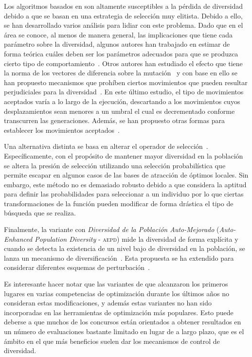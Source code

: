 Los algoritmos basados en \DE{} son altamente susceptibles a la pérdida de diversidad debido a que se basan en una estrategia de selección muy elitista.
%
Debido a ello, se han desarrollado varios análisis para lidiar con este problema.
%
Dado que en el área se conoce, al menos de manera general, las implicaciones que tiene cada parámetro sobre la diversidad, algunos autores han trabajado
en estimar de forma teórica cuáles deben ser los parámetros adecuados para que se produzca cierto tipo de comportamiento~\cite{zaharie2003control}.
%
Otros autores han estudiado el efecto que tiene la norma de los vectores de diferencia sobre la mutación~\cite{montgomery2009differential} y con base
en ello se han propuesto mecanismos que prohíben ciertos movimientos que pueden resultar perjudiciales para la diversidad~\cite{montgomery2012simple}.
%
En este último estudio, el tipo de movimientos aceptados varía a lo largo de la ejecución, descartando a los movimientos cuyos desplazamientos sean menores
a un umbral el cual es decrementado conforme transcurren las generaciones.
%
Además, se han propuesto otras formas para establecer los movimientos aceptados~\cite{bolufe2013differential}.

Una alternativa distinta se basa en alterar el operador de selección~\cite{sa2008exploration}.
%
Específicamente, con el propósito de mantener mayor diversidad en la población se altera la presión de selección utilizando una selección probabilística que
permite escapar en algunos casos de las bases de atracción de óptimos locales.
%
Sin embargo, este método no es demasiado robusto debido a que considera la aptitud para definir las probabilidades para seleccionar a un individuo por lo que ciertas 
transformaciones de la función pueden modificar de forma drástica el tipo de búsqueda que se realiza.

Finalmente, la variante \DE{} con \textit{Diversidad de la Población Auto-Mejorado} (\textit{Auto-Enhanced Population Diversity} - \textsc{aepd}) 
mide la diversidad de forma explícita y cuando se detecta la existencia de un nivel bajo de diversidad en la población, se 
lanza un mecanismo de diversificación~\cite{yang2015differential}.
%
Esta propuesta se ha extendido para considerar diferentes esquemas de perturbación~\cite{zhao2016differential}.

Es interesante hacer notar que las variantes de \DE{} que alcanzaron los primeros lugares en varias competencias de optimización durante los últimos años
no consideran estas modificaciones, y además estas variantes no han sido incorporadas en las herramientas de optimización más populares.
%
Esto puede deberse a que muchos de los concursos están orientados a obtener resultados en un número de 
evaluaciones bastante limitado en lugar de a largo plazo,
que es el ámbito en el que más beneficios suelen dar los mecanismos de control de diversidad.


